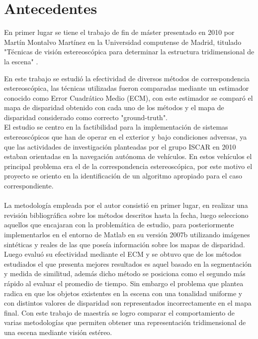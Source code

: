 \documentclass[letterpaper,titlepage,12pt,oneside,spanish,final]{report_eie}
\numberwithin{equation}{chapter}%
\numberwithin{figure}{chapter}%
\numberwithin{table}{chapter}%
\numberwithin{definition}{chapter}%
\numberwithin{lemma}{chapter}%
\numberwithin{theorem}{chapter}%
\numberwithin{corollary}{chapter}%
\numberwithin{condition}{chapter}%
\numberwithin{criterion}{chapter}%
\numberwithin{problem}{chapter}%
\numberwithin{property}{chapter}%
\numberwithin{proposition}{chapter}%
\numberwithin{solution}{chapter}%
\numberwithin{conjecture}{chapter}%
\begin{document}
\section*{Antecedentes}
En primer lugar se tiene el trabajo de fin de máster presentado en 2010 por
Martín Montalvo Martínez en la Universidad computense de Madrid, titulado "Técnicas de visión estereoscópica para determinar la estructura tridimensional de la escena"  \cite{MartinMM}.

En este trabajo se estudió la efectividad de diversos métodos de correspondencia estereoscópica, las técnicas utilizadas fueron comparadas mediante un estimador conocido como Error Cuadrático Medio (ECM), con este estimador se comparó el mapa de disparidad obtenido con cada uno de los métodos y el mapa de disparidad considerado como correcto "ground-truth". 
\\
El estudio se centro en la factibilidad para la implementación de sistemas estereoscópicos que han de operar en el exterior y bajo condiciones adversas, ya que las actividades de investigación planteadas por el grupo ISCAR en 2010 estaban orientadas en la navegación autónoma de vehículos. En estos vehículos el principal problema era el de la correspondencia estereoscópica, por este motivo el proyecto se oriento en la identificación de un algoritmo apropiado para el caso correspondiente.
\\
\\
La metodología empleada por el autor consistió en primer lugar, en realizar una revisión bibliográfica sobre los métodos descritos hasta la fecha, luego selecciono aquellos que encajaran con la problemática de estudio, para posteriormente implementarlos en el entorno de Matlab en su versión 2007b utilizando imágenes sintéticas y reales de las que poseía información sobre los mapas de disparidad. Luego evaluó su efectividad mediante el ECM y se obtuvo que de los métodos estudiados el que presenta mejores resultados es aquel basado en la segmentación y medida de similitud, además dicho método  se posiciona como el segundo más rápido al evaluar el promedio de tiempo. Sin embargo el problema que plantea radica en que los objetos existentes en la escena con una tonalidad uniforme y con distintos valores de disparidad son representados incorrectamente en el mapa final. Con este trabajo de maestría se logro comparar el comportamiento de varias metodologías que permiten obtener una representación tridimensional de una escena mediante visión estéreo.
\\
\\
\end{document}

